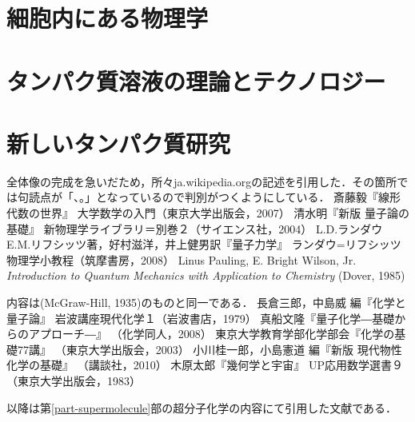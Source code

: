 \documentclass[uplatex, dvipdfmx]{jsreport}
\begin{document}
\chapter{細胞内にある物理学}
\chapter{タンパク質溶液の理論とテクノロジー}
\chapter{新しいタンパク質研究}

\begin{thebibliography}{99}
    \bibitem{}
    全体像の完成を急いだため，所々ja.wikipedia.orgの記述を引用した．その箇所では句読点が「、。」となっているので判別がつくようにしている．
        斎藤毅『線形代数の世界』
        大学数学の入門（東京大学出版会，2007）
        清水明『新版 量子論の基礎』
        新物理学ライブラリ＝別巻２（サイエンス社，2004）
        L.D.ランダウ　E.M.リフシッツ著，好村滋洋，井上健男訳『量子力学』
        ランダウ=リフシッツ物理学小教程（筑摩書房，2008）
        Linus Pauling, E. Bright Wilson, Jr. \textit{Introduction to Quantum Mechanics with Application to Chemistry}
        (Dover, 1985)
        
        内容は(McGraw-Hill, 1935)のものと同一である．
        長倉三郎，中島威 編『化学と量子論』
        岩波講座現代化学１（岩波書店，1979）
        真船文隆『量子化学―基礎からのアプローチ―』
        （化学同人，2008）
        東京大学教育学部化学部会『化学の基礎77講』
        （東京大学出版会，2003）
        小川桂一郎，小島憲道 編『新版 現代物性化学の基礎』
        （講談社，2010）
        木原太郎『幾何学と宇宙』
        UP応用数学選書９（東京大学出版会，1983）

    以降は第\ref{part-supermolecule}部の超分子化学の内容にて引用した文献である．


\end{thebibliography}
\end{document}
